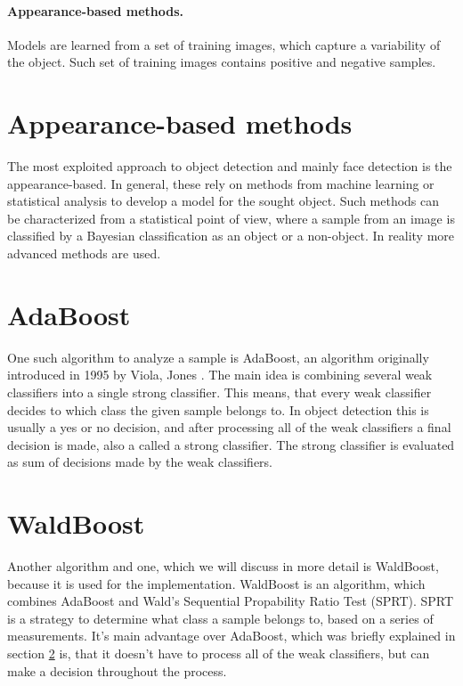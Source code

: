 \paragraph{Appearance-based methods.} Models are learned from a set of training images, which capture a variability of the object. Such set of training images contains positive and negative samples.

\section{Appearance-based methods} \label{sec:appeareance-based}

The most exploited approach to object detection and mainly face detection is the appearance-based. In general, these rely on methods from machine learning or statistical analysis to develop a model for the sought object. Such methods can be characterized from a statistical point of view, where a sample from an image is classified by a Bayesian classification as an object or a non-object. In reality more advanced methods are used.

\section{AdaBoost}\label{sec:adaboost}

One such algorithm to analyze a sample is AdaBoost, an algorithm originally introduced in 1995 by Viola, Jones \cite{Viola01rapidobject}. The main idea is combining several weak classifiers into a single strong classifier. This means, that every weak classifier decides to which class the given sample belongs to. In object detection this is usually a yes or no decision, and after processing all of the weak classifiers a final decision is made, also a called a strong classifier. The strong classifier is evaluated as sum of decisions made by the weak classifiers.

\section{WaldBoost}\label{sec:waldboost}

Another algorithm and one, which we will discuss in more detail is WaldBoost, because it is used for the implementation. WaldBoost is an algorithm, which combines AdaBoost and Wald's Sequential Propability Ratio Test (SPRT). SPRT is a strategy to determine what class a sample belongs to, based on a series of measurements. It's main advantage over AdaBoost, which was briefly explained in section \ref{sec:adaboost} is, that it doesn't have to process all of the weak classifiers, but can make a decision throughout the process.

